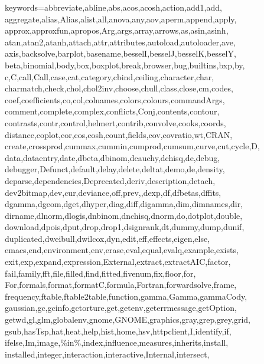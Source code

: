 \def\zz{\ifx\[$\else\aftergroup\zzz\fi}
\def\zzz{\setbox0\lastbox
\dimen0\dimexpr\extrarowheight + \ht0-\dp0\relax
\setbox0\hbox{\raise-.5\dimen0\box0}%
\ht0=\dimexpr\ht0+\extrarowheight\relax
\dp0=\dimexpr\dp0+\extrarowheight\relax
\box0
}

%
{keywords={abbreviate,abline,abs,acos,acosh,action,add1,add,%
        aggregate,alias,Alias,alist,all,anova,any,aov,aperm,append,apply,%
        approx,approxfun,apropos,Arg,args,array,arrows,as,asin,asinh,%
        atan,atan2,atanh,attach,attr,attributes,autoload,autoloader,ave,%
        axis,backsolve,barplot,basename,besselI,besselJ,besselK,besselY,%
        beta,binomial,body,box,boxplot,break,browser,bug,builtins,bxp,by,%
        c,C,call,Call,case,cat,category,cbind,ceiling,character,char,%
        charmatch,check,chol,chol2inv,choose,chull,class,close,cm,codes,%
        coef,coefficients,co,col,colnames,colors,colours,commandArgs,%
        comment,complete,complex,conflicts,Conj,contents,contour,%
        contrasts,contr,control,helmert,contrib,convolve,cooks,coords,%
        distance,coplot,cor,cos,cosh,count,fields,cov,covratio,wt,CRAN,%
        create,crossprod,cummax,cummin,cumprod,cumsum,curve,cut,cycle,D,%
        data,dataentry,date,dbeta,dbinom,dcauchy,dchisq,de,debug,%
        debugger,Defunct,default,delay,delete,deltat,demo,de,density,%
        deparse,dependencies,Deprecated,deriv,description,detach,%
        dev2bitmap,dev,cur,deviance,off,prev,,dexp,df,dfbetas,dffits,%
        dgamma,dgeom,dget,dhyper,diag,diff,digamma,dim,dimnames,dir,%
        dirname,dlnorm,dlogis,dnbinom,dnchisq,dnorm,do,dotplot,double,%
        download,dpois,dput,drop,drop1,dsignrank,dt,dummy,dump,dunif,%
        duplicated,dweibull,dwilcox,dyn,edit,eff,effects,eigen,else,%
        emacs,end,environment,env,erase,eval,equal,evalq,example,exists,%
        exit,exp,expand,expression,External,extract,extractAIC,factor,%
        fail,family,fft,file,filled,find,fitted,fivenum,fix,floor,for,%
        For,formals,format,formatC,formula,Fortran,forwardsolve,frame,%
        frequency,ftable,ftable2table,function,gamma,Gamma,gammaCody,%
        gaussian,gc,gcinfo,gctorture,get,getenv,geterrmessage,getOption,%
        getwd,gl,glm,globalenv,gnome,GNOME,graphics,gray,grep,grey,grid,%
        gsub,hasTsp,hat,heat,help,hist,home,hsv,httpclient,I,identify,if,%
        ifelse,Im,image,\%in\%,index,influence,measures,inherits,install,%
        installed,integer,interaction,interactive,Internal,intersect,%
}}
